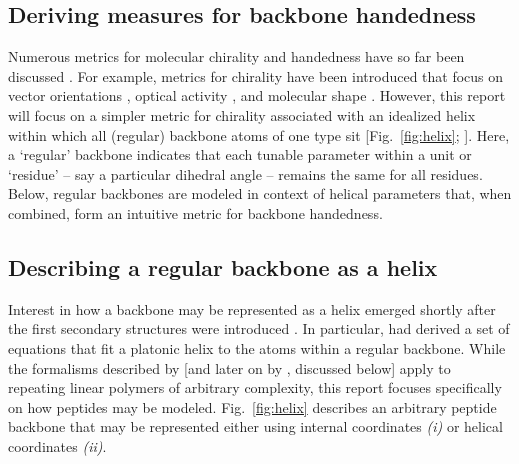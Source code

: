 \documentclass[fleqn,10pt,lineno]{wlpeerj} %
\newcommand{\n}[1]{{\color{black}#1}} %
\newcommand{\Fig}[1]{Fig.~\ref{#1}}
\begin{document}
\subsection*{Deriving measures for backbone handedness}
Numerous metrics for molecular chirality and handedness have so far been discussed \citep{Harris1999}. For example, metrics for chirality have been introduced that focus on vector orientations \citep{Kwiecinska2005,Kabsch1983,Gruziel2013}, optical activity \citep{Osipov1995}, and molecular shape \citep{Ferrarini1998}. However, this report will focus on a simpler metric for chirality associated with an idealized helix within which 
all (regular) backbone atoms of one type sit \n{[\Fig{fig:helix};} \cite{Shimanouchi1955,Miyazawa1961,Zacharias2013}\n{]}. 
Here, a `regular' backbone  indicates that each tunable parameter within a unit or `residue' -- say a particular dihedral angle -- remains the same for all residues. Below, regular backbones are modeled in context of helical parameters that, when combined, form an intuitive metric for backbone handedness.

\subsection*{Describing a regular backbone as a helix} 
Interest in how a backbone may be represented as a helix emerged shortly after the first secondary structures were introduced \citep{Pauling1951,Pauling1951a,Pauling1951b}. In particular, \cite{Shimanouchi1955} had derived a set of equations that fit a platonic helix to the atoms within a regular backbone. 
While the formalisms described by \cite{Shimanouchi1955} [and later on by \cite{Miyazawa1961}, discussed below] apply to repeating linear polymers of arbitrary complexity, %
this report focuses specifically on how peptides may be modeled. \Fig{fig:helix} describes an arbitrary peptide backbone that may be represented either using internal coordinates \textit{(i)} or helical coordinates \textit{(ii)}. 
\end{document}
